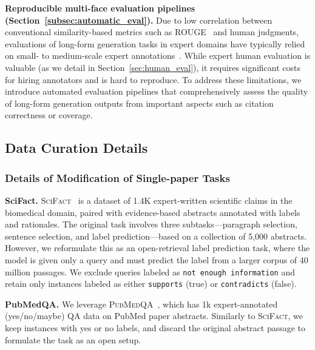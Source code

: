 \documentclass{article} %
\renewcommand{\paragraph}[1]{\noindent \textbf{#1}}
\newcommand{\Sref}[1]{Section~\ref{#1}}
\begin{document}
\paragraph{Reproducible multi-face evaluation pipelines (\Sref{subsec:automatic_eval}).}  
Due to low correlation between conventional similarity-based metrics such as ROUGE~\citep{xu2023critical,malaviya2023expertqa} and human judgments, evaluations of long-form generation tasks in expert domains have typically relied on small- to medium-scale expert annotations~\citep{zheng2024openresearcher,singhal2023large,si2024can}. While expert human evaluation is valuable (as we detail in \Sref{sec:human_eval}), it requires significant costs for hiring annotators and is hard to reproduce. 
To address these limitations, we introduce automated evaluation pipelines that comprehensively assess the quality of long-form generation outputs from important aspects such as citation correctness or coverage. 

\subsection{Data Curation Details}
\label{app_sec:annotation_details}

\subsubsection{Details of Modification of Single-paper Tasks }
\paragraph{SciFact.}
\textsc{SciFact}~\citep{wadden-etal-2020-fact} is a dataset of 1.4K expert-written scientific claims in the biomedical domain, paired with evidence-based abstracts annotated with labels and rationales. The original task involves three subtasks---paragraph selection, sentence selection, and label prediction---based on a collection of 5,000 abstracts. However, we reformulate this as an open-retrieval label prediction task, where the model is given only a query and must predict the label from a larger corpus of 40 million passages. 
We exclude queries labeled as \texttt{not enough information} and retain only instances labeled as either \texttt{supports} (true) or \texttt{contradicts} (false).


\paragraph{PubMedQA.}
We leverage \textsc{PubMedQA}~\citep{jin-etal-2019-pubmedqa}, which has 1k expert-annotated (yes/no/maybe) QA data on PubMed paper abstracts. 
Similarly to \textsc{SciFact}, we keep instances with yes or no labels, and discard the original abstract passage to formulate the task as an open setup. 
\end{document}
